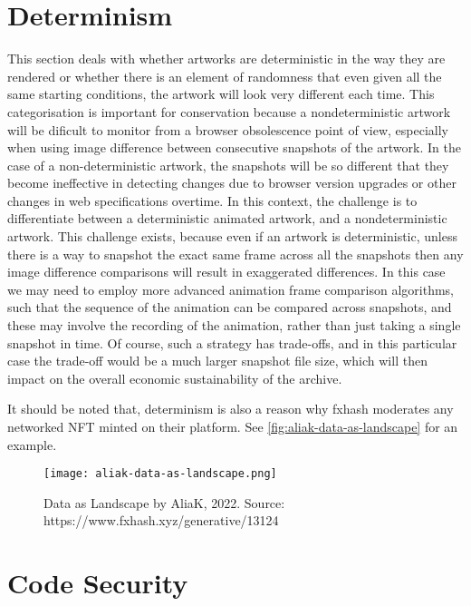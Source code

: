 \section{Determinism}

This section deals with whether artworks are deterministic in the way they are rendered or whether there is an element of randomness that even given all the same starting conditions, the artwork will look very different each time. This categorisation is important for conservation because a nondeterministic artwork will be dificult to monitor from a browser obsolescence point of view, especially when using image difference between consecutive snapshots of the artwork. In the case of a non-deterministic artwork, the snapshots will be so different that they become ineffective in detecting changes due to browser version upgrades or other changes in web specifications overtime. In this context, the challenge is to differentiate between a deterministic animated artwork, and a nondeterministic artwork. This challenge exists, because even if an artwork is deterministic, unless there is a way to snapshot the exact same frame across all the snapshots then any image difference comparisons will result in exaggerated differences. In this case we may need to employ more advanced animation frame comparison algorithms, such that the sequence of the animation can be compared across snapshots, and these may involve the recording of the animation, rather than just taking a single snapshot in time. Of course, such a strategy has trade-offs, and in this particular case the trade-off would be a much larger snapshot file size, which will then impact on the overall economic sustainability of the archive.

It should be noted that, determinism is also a reason why fxhash moderates any networked NFT minted on their platform. See \autoref{fig:aliak-data-as-landscape} for an example.

\begin{figure}[h]
    \centering
    \texttt{[image: aliak-data-as-landscape.png]}
    \caption[Data as Landscape by AliaK]{Data as Landscape by AliaK, 2022. Source: https://www.fxhash.xyz/generative/13124}
    \label{fig:aliak-data-as-landscape}
\end{figure}



\section{Code Security}

